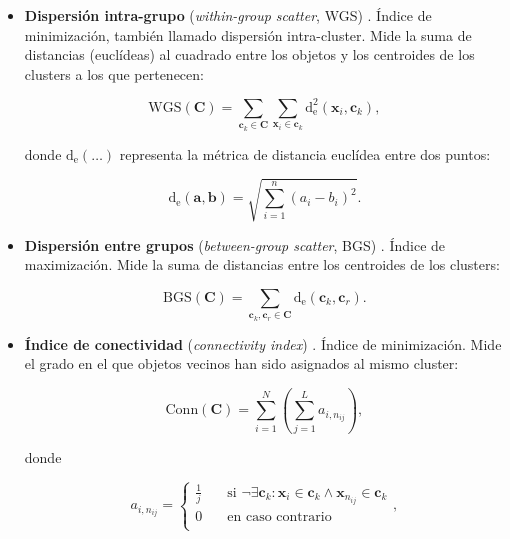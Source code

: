 \begin{itemize}
	\item \textbf{Dispersión intra-grupo} (\emph{within-group scatter}, WGS) \cite{macqueen1967some}. Índice de minimización, también llamado dispersión intra-cluster. Mide la suma de distancias (euclídeas) al cuadrado entre los objetos y los centroides de los clusters a los que pertenecen:
	
	\begin{equation}
		\text{WGS}(\textbf{C}) = \sum_{\textbf{c}_k \in \textbf{C}} \sum_{\textbf{x}_i \in \textbf{c}_k} \text{d}_{\text{e}}^2 (\textbf{x}_i,\textbf{\=c}_k),
	\end{equation}
	
	donde $\text{d}_{\text{e}}(\dots)$ representa la métrica de distancia euclídea entre dos puntos:
	
	\begin{equation}\text{d}_{\text{e}}(\textbf{a},\textbf{b}) = \sqrt{\sum_{i=1}^{n}{(a_i-b_i)^2}}.
	\end{equation}
	

	\item \textbf{Dispersión entre grupos} (\emph{between-group scatter}, BGS) \cite{theodoridis1999pattern}. Índice de maximización. Mide la suma de distancias entre los centroides de los clusters:
	
	\begin{equation}
		\text{BGS}(\textbf{C}) = \sum_{\textbf{c}_k,\textbf{c}_r \in \textbf{C}} \text{d}_{\text{e}} (\textbf{\=c}_k,\textbf{\=c}_r).
	\end{equation}
	
	\item \textbf{Índice de conectividad} (\emph{connectivity index}) \cite{handl2007evolutionary}. Índice de minimización. Mide el grado en el que objetos vecinos han sido asignados al mismo cluster:
	
	\begin{equation}\label{eq:conn}
		\text{Conn}(\textbf{C}) = \sum^{N}_{i=1}\left( \sum^{L}_{j=1} a_{i,n_{ij}} \right),
	\end{equation}
	
	donde
	
	\begin{equation}
	a_{i,n_{ij}} = \begin{cases}
       \frac{1}{j} &\quad\text{si  } \neg \exists \textbf{c}_k : \textbf{x}_i \in \textbf{c}_k \land \textbf{x}_{n_{ij}} \in \textbf{c}_k\\
       0 & \quad\text{en caso contrario}\\
  	\end{cases},
  \end{equation}
	

\end{itemize}
